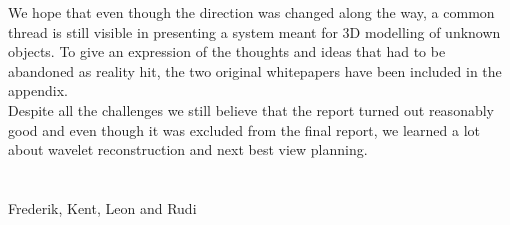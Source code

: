 We hope that even though the direction was changed along the way, a common thread is still visible in presenting a system meant for 3D modelling of unknown objects. To give an expression of the thoughts and ideas that had to be abandoned as reality hit, the two original whitepapers have been included in the appendix.\\

Despite all the challenges we still believe that the report turned out reasonably good and even though it was excluded from the final report, we learned a lot about wavelet reconstruction and next best view planning.\\
 \\
  \\
 Frederik, Kent, Leon and Rudi